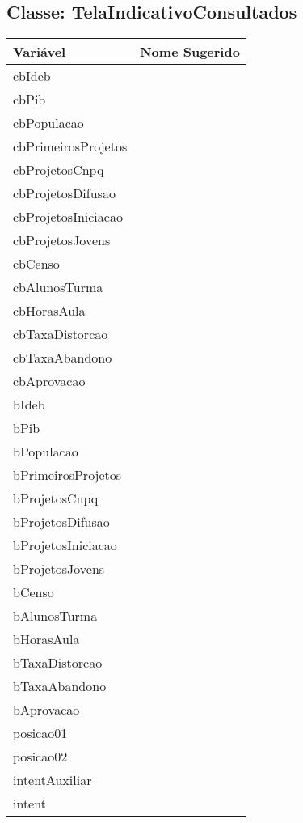 \documentclass[12pt]{article}
\begin{document}
	\subsection{Classe: TelaIndicativoConsultados}
		\begin{table}[H]
			\begin{center}
				\begin{tabular}{l | l}
					\toprule
						Variável & Nome Sugerido\\
					\midrule
						cbIdeb & \\
						cbPib & \\
						cbPopulacao & \\
						cbPrimeirosProjetos & \\
						cbProjetosCnpq & \\
						cbProjetosDifusao & \\
						cbProjetosIniciacao & \\
						cbProjetosJovens & \\
						cbCenso & \\
						cbAlunosTurma & \\
						cbHorasAula & \\
						cbTaxaDistorcao & \\
						cbTaxaAbandono & \\
						cbAprovacao & \\
						bIdeb & \\
						bPib & \\
						bPopulacao & \\
						bPrimeirosProjetos & \\
						bProjetosCnpq & \\
						bProjetosDifusao & \\
						bProjetosIniciacao & \\
						bProjetosJovens & \\
						bCenso & \\
						bAlunosTurma & \\
						bHorasAula & \\
						bTaxaDistorcao & \\
						bTaxaAbandono & \\
						bAprovacao & \\
						posicao01 & \\
						posicao02 & \\
						intentAuxiliar & \\
						intent & \\
					\bottomrule
				\end{tabular}
			\end{center}
		\end{table}
\end{document}
